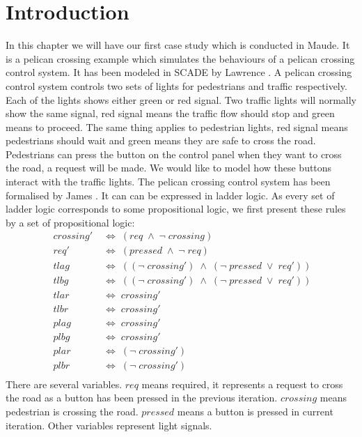 \documentclass[a4paper,11pt]{report}
\begin{document}
\section{Introduction}
In this chapter we will have our first case study which is conducted in Maude. It is a pelican crossing example which simulates the behaviours of a pelican crossing control system. It has been modeled in SCADE by Lawrence \cite{mres}. A pelican crossing control system controls two sets of lights for pedestrians and traffic respectively. Each of the lights shows either green or red signal. Two traffic lights will normally show the same signal, red signal means the traffic flow should stop and green means to proceed. The same thing applies to pedestrian lights, red signal means pedestrians should wait and green means they are safe to cross the road. Pedestrians can press the button on the control panel when they want to cross the road, a request will be made. 
We would like to model how these buttons interact with the traffic lights. The pelican crossing control system has been formalised by James \cite{pjll}. It can can be expressed in ladder logic. As every set of ladder logic corresponds to some propositional logic, we first present these rules by a set of propositional logic:
\begin{align*}
\;crossing'\;&\Leftrightarrow\;(req\;\wedge\;\neg\;crossing)\\
\;req'\;&\Leftrightarrow\;(pressed\;\wedge\;\neg\;req)\\
\;tlag\;&\Leftrightarrow\;((\neg\;crossing')\;\wedge\;(\neg\;pressed\;\vee\;req'))\\
\;tlbg\;&\Leftrightarrow\;((\neg\;crossing')\;\wedge\;(\neg\;pressed\;\vee\;req'))\\
\;tlar\;&\Leftrightarrow\;crossing'\\
\;tlbr\;&\Leftrightarrow\;crossing'\\
\;plag\;&\Leftrightarrow\;crossing'\\
\;plbg\;&\Leftrightarrow\;crossing'\\
\;plar\;&\Leftrightarrow\;(\neg\;crossing')\\
\;plbr\;&\Leftrightarrow\;(\neg\;crossing')\\
\end{align*}
There are several variables. $req$ means required, it represents a request to cross the road as a button has been pressed in the previous iteration. $crossing$ means pedestrian is crossing the road. $pressed$ means a button is pressed in current iteration. Other variables represent light signals.
\end{document}
